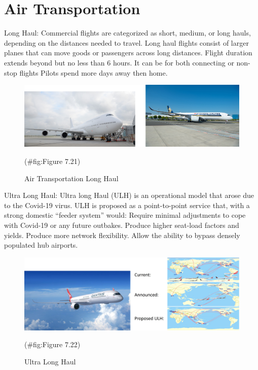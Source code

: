 \documentclass[
]{book}
\begin{document}
\hypertarget{SupplyChain-airtpt}{%
\section{Air Transportation}\label{SupplyChain-airtpt}}

Long Haul:
Commercial flights are categorized as short, medium, or long hauls, depending on the distances needed to travel.
Long haul flights consist of larger planes that can move goods or passengers across long distances.
Flight duration extends beyond but no less than 6 hours.
It can be for both connecting or non-stop flights
Pilots spend more days away then home.

\begin{figure}

{\centering \includegraphics{./Images/supplychain/Air Transportation Long Haul} 

}

\caption{Air Transportation Long Haul}(\#fig:Figure 7.21)
\end{figure}

Ultra Long Haul:
Ultra long Haul (ULH) is an operational model that arose due to the Covid-19 virus.
ULH is proposed as a point-to-point service that, with a strong domestic ``feeder system'' would:
Require minimal adjustments to cope with Covid-19 or any future outbakes.
Produce higher seat-load factors and yields.
Produce more network flexibility.
Allow the ability to bypass densely populated hub airports.

\begin{figure}

{\centering \includegraphics{./Images/supplychain/Ultra Long Haul} 

}

\caption{Ultra Long Haul}(\#fig:Figure 7.22)
\end{figure}
\end{document}
